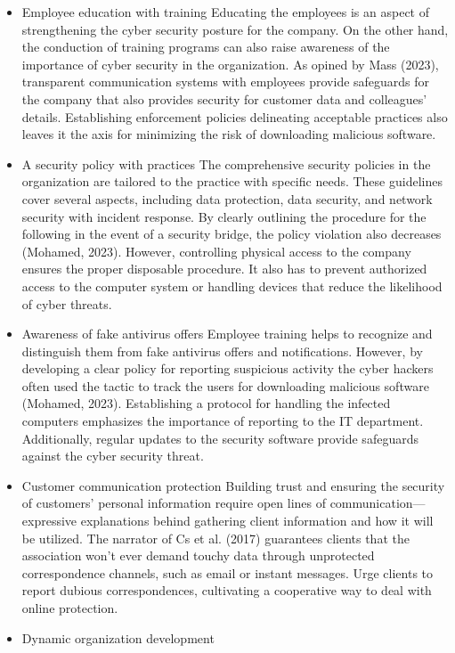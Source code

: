 \begin{itemize}
    \item Employee education with training
Educating the employees is an aspect of strengthening the cyber security posture for the 
company. On the other hand, the conduction of training programs can also raise awareness of the 
importance of cyber security in the organization. As opined by Mass (2023), transparent 
communication systems with employees provide safeguards for the company that also provides 
security for customer data and colleagues' details. Establishing enforcement policies 
delineating acceptable practices also leaves it the axis for minimizing the risk of downloading 
malicious software. 
    \item A security policy with practices
The comprehensive security policies in the organization are tailored to the practice with specific needs. These guidelines cover several aspects, including data protection, data security, and network security with incident response. By clearly outlining the procedure for the following in the event of a security bridge, the policy violation also decreases (Mohamed, 2023). However, controlling physical access to the company ensures the proper disposable procedure. It also has to prevent authorized access to the computer system or handling devices that reduce the likelihood of cyber threats. 
     \item Awareness of fake antivirus offers
Employee training helps to recognize and distinguish them from fake antivirus offers and notifications. However, by developing a clear policy for reporting suspicious activity the cyber hackers often used the tactic to track the users for downloading malicious software (Mohamed, 2023). Establishing a protocol for handling the infected computers emphasizes the importance of reporting to the IT department. Additionally, regular updates to the security software provide safeguards against the cyber security threat.
    \item Customer communication protection
Building trust and ensuring the security of customers' personal information require open lines of communication—expressive explanations behind gathering client information and how it will be utilized. The narrator of Cs et al. (2017) guarantees clients that the association won't ever demand touchy data through unprotected correspondence channels, such as email or instant messages. Urge clients to report dubious correspondences, cultivating a cooperative way to deal with online protection.
    \item Dynamic organization development

\end{itemize}
